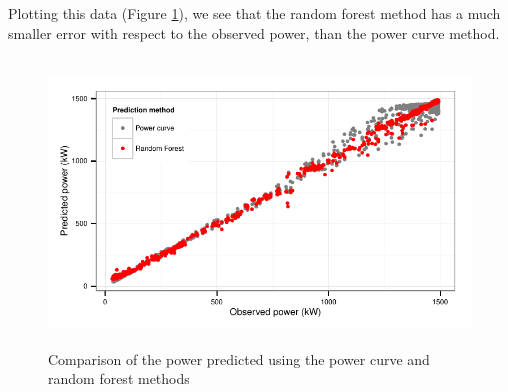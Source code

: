 \documentclass[nojss]{jss}\usepackage[]{graphicx}\usepackage[]{color}
\makeatletter
\newenvironment{kframe}{%
 \def\at@end@of@kframe{}%
 \ifinner\ifhmode%
  \def\at@end@of@kframe{\end{minipage}}%
  \begin{minipage}{\columnwidth}%
 \fi\fi%
 \def\FrameCommand##1{\hskip\@totalleftmargin \hskip-\fboxsep
 \colorbox{shadecolor}{##1}\hskip-\fboxsep
     \hskip-\linewidth \hskip-\@totalleftmargin \hskip\columnwidth}%
 \MakeFramed {\advance\hsize-\width
   \@totalleftmargin\z@ \linewidth\hsize
   \@setminipage}}%
 {\par\unskip\endMakeFramed%
 \at@end@of@kframe}
\newenvironment{knitrout}{}{} %
\makeatother
\begin{document}
Plotting this data (Figure \ref{fig:PCversusRF}), we see that the random forest method has a much smaller error with respect to the observed power, than the power curve method.
\begin{knitrout}
\color{fgcolor}\begin{kframe}


{\ttfamily\noindent\color{warningcolor}{\#\# Warning in loop\_apply(n, do.ply): Removed 7 rows containing missing values (geom\_point).}}\end{kframe}\begin{figure}[h]

{\centering \includegraphics[width=5in,height=3in]{figure/PCversusRF-1} 

}

\caption[Comparison of the power predicted using the power curve and random forest methods]{Comparison of the power predicted using the power curve and random forest methods}\label{fig:PCversusRF}
\end{figure}


\end{knitrout}
\end{document}
